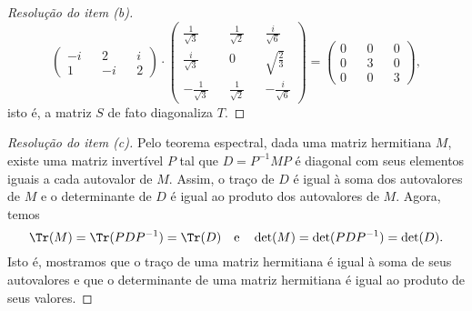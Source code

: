 \begin{proof}[Resolução do item (b)]
\begin{equation*}
\begin{pmatrix}
            -i&& 2 && i\\
            1 &&-i && 2
        \end{pmatrix}
        \cdot
        \begin{pmatrix}
            \frac{1}{\sqrt{3}} && \frac{1}{\sqrt{2}} && \frac{i}{\sqrt{6}}\\
            \frac{i}{\sqrt{3}} && 0 && \sqrt{\frac23}\\
            -\frac{1}{\sqrt{3}}&& \frac{1}{\sqrt{2}} && -\frac{i}{\sqrt{6}}
        \end{pmatrix}
        =
        \begin{pmatrix}
            0 && 0 && 0\\
            0 && 3 && 0\\
            0 && 0 && 3
        \end{pmatrix},
    \end{equation*}
    isto é, a matriz \(S\) de fato diagonaliza \(T\).
\end{proof}
\begin{proof}[Resolução do item (c)]
    Pelo teorema espectral, dada uma matriz hermitiana \(M\), existe uma matriz invertível \(P\) tal que \(D = P^{-1}MP\) é diagonal com seus elementos iguais a cada autovalor de \(M\). Assim, o traço de \(D\) é igual à soma dos autovalores de \(M\) e o determinante de \(D\) é igual ao produto dos autovalores de \(M\). Agora, temos
    \begin{equation*}
        \Tr(M) = \Tr(PDP^{-1}) = \Tr(D)\quad\text{e}\quad\det(M) = \det(PDP^{-1}) = \det(D).
    \end{equation*}
    Isto é, mostramos que o traço de uma matriz hermitiana é igual à soma de seus autovalores e que o determinante de uma matriz hermitiana é igual ao produto de seus valores.
\end{proof}
